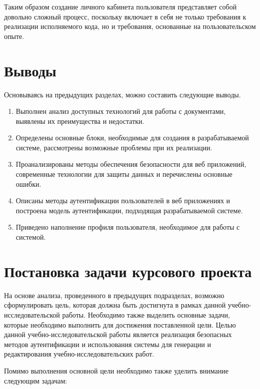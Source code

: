 Таким образом создание личного кабинета пользователя представляет собой довольно сложный процесс, поскольку включает в себя не только требования к реализации исполняемого кода, но и требования, основанные на пользовательском опыте.

\section{Выводы}

Основываясь на предыдущих разделах, можно составить следующие выводы.

\begin{enumerate}

\item Выполнен анализ доступных технологий для работы с документами, выявлены их преимущества и недостатки.

\item Определены основные блоки, необходимые для создания в разрабатываемой системе, рассмотрены возможные проблемы при их реализации.

\item Проанализированы методы обеспечения безопасности для веб приложений, современные технологии для защиты данных и перечислены основные ошибки.

\item Описаны методы аутентификации пользователей в веб приложениях и построена модель аутентификации, подходящая разрабатываемой системе.

\item Приведено наполнение профиля пользователя, необходимое для работы с системой.

\end{enumerate}

\section{Постановка задачи курсового проекта}

На основе анализа, проведенного в предыдущих подразделах, возможно сформулировать цель, которая должна быть достигнута в рамках данной учебно-исследовательской работы. Необходимо также выделить основные задачи, которые необходимо выполнить для достижения поставленной цели. Целью данной учебно-исследовательской работы является реализация безопасных методов аутентификации и использования системы для генерации и редактирования учебно-исследовательских работ.

Помимо выполнения основной цели необходимо также уделить внимание следующим задачам:


